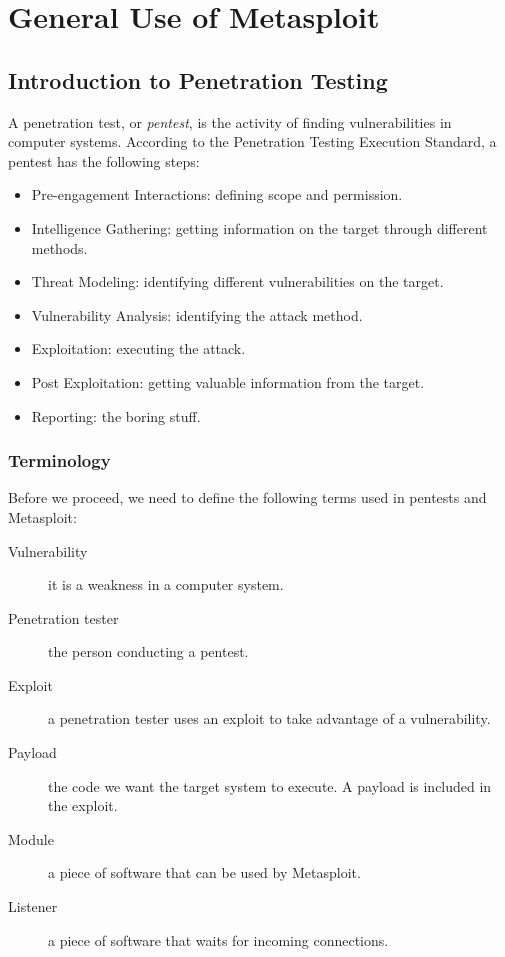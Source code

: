 \chapter{General Use of Metasploit}

\section{Introduction to Penetration Testing}
A penetration test, or \textit{pentest}, is the activity of finding vulnerabilities in computer systems. According to the Penetration Testing Execution Standard, a pentest has the following steps\cite{pentest-standard}:

\begin{itemize}
    \item Pre-engagement Interactions: defining scope and permission.
    \item Intelligence Gathering: getting information on the target through different methods.
    \item Threat Modeling: identifying different vulnerabilities on the target.
    \item Vulnerability Analysis: identifying the attack method.
    \item Exploitation: executing the attack.
    \item Post Exploitation: getting valuable information from the target.
    \item Reporting: the boring stuff.
\end{itemize}

\subsection{Terminology}

Before we proceed, we need to define the following terms used in pentests and Metasploit:

\begin{description}
    \item[Vulnerability] it is a weakness in a computer system.
    \item[Penetration tester] the person conducting a pentest.
    \item[Exploit] a penetration tester uses an exploit to take advantage of a vulnerability.
    \item[Payload] the code we want the target system to execute. A payload is included in the exploit.
    \item[Module] a piece of software that can be used by Metasploit.
    \item[Listener] a piece of software that waits for incoming connections.
\end{description}

